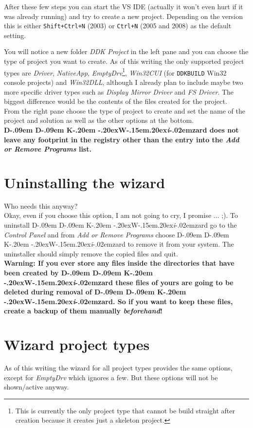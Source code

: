 \documentclass[a4paper,titlepage]{report}
\newcommand{\important}[1]{\textcolor[rgb]{0.90,0.00,0.00}{\textbf{#1}}}
\def\ddkwiz{D\kern-.09em D\kern-.09em K\kern-.20em \raise-.20ex\hbox{W}\kern-.15em\raise.20ex\hbox{\it{i}}\kern-.02em{zard}}
\begin{document}
After these few steps you can start the VS IDE (actually it won't even hurt if it
was already running) and try to create a new project. Depending on the version
this is either \texttt{Shift+Ctrl+N} (2003) or \texttt{Ctrl+N} (2005 and 2008)
as the default setting.

You will notice a new folder \emph{DDK Project} in the left pane and you
can choose the type of project you want to create. As of this writing the
only supported project types are \emph{Driver}, \emph{NativeApp}, \emph{EmptyDrv}\footnote{This
is currently the only project type that cannot be build straight after creation
because it creates just a skeleton project.}, \emph{Win32CUI} (for \texttt{DDKBUILD}
Win32 console projects) and \emph{Win32DLL}, although I already plan to include
maybe two more specific driver types such as \emph{Display Mirror Driver} and
\emph{FS Driver}. The biggest difference would be the contents of the files created
for the project.\\

From the right pane choose the type of project to create and set the name
of the project and solution as well as the other options at the bottom.\\

\important{\ddkwiz{} does not leave any footprint in the registry other than
the entry into the \emph{Add or Remove Programs} list.}

\section{Uninstalling the wizard}
Who needs this anyway?\\

Okay, even if you choose this option, I am not going to cry, I promise ... \textsf{;)}. To
uninstall \ddkwiz{} go to the \emph{Control Panel} and from \emph{Add or Remove Programs}
choose \ddkwiz{} to remove it from your system. The uninstaller should simply
remove the copied files and quit.\\

\important{Warning: If you ever store any files inside the directories that
have been created by \ddkwiz{} these files of yours are going to be deleted during
removal of \ddkwiz{}. So if you want to keep these files, create a backup
of them manually \emph{beforehand}!}

\section{Wizard project types}
\label{sec:projtypes}
As of this writing the wizard for all project types provides the same options,
except for \emph{EmptyDrv} which ignores a few. But these options will not
be shown/active anyway.
\end{document}
